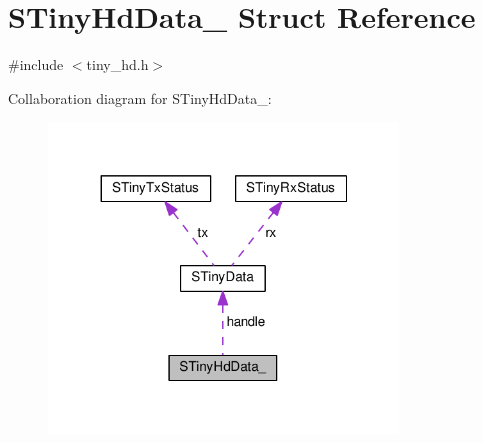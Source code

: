 \hypertarget{structSTinyHdData__}{}\section{S\+Tiny\+Hd\+Data\+\_\+ Struct Reference}
\label{structSTinyHdData__}


{\ttfamily \#include $<$tiny\+\_\+hd.\+h$>$}



Collaboration diagram for S\+Tiny\+Hd\+Data\+\_\+\+:
\nopagebreak
\begin{figure}[H]
\begin{center}
\leavevmode
\includegraphics[width=263pt]{structSTinyHdData____coll__graph}
\end{center}
\end{figure}

